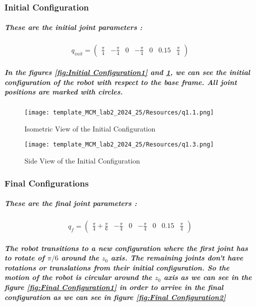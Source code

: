 \subsubsection{Initial Configuration}
\subparagraph{These are the initial joint parameters :}
\[
q_{init} = \begin{pmatrix}
    \frac{\pi}{4} & -\frac{\pi}{4} & 0 & -\frac{\pi}{4} & 0 & 0.15 & \frac{\pi}{4}
\end{pmatrix}
\]
\subparagraph{In the figures \ref{fig:Initial Configuration1} and \ref{fig:Initial Configuration2}, we can see the initial configuration of the robot with respect to the base frame. All joint positions are marked with circles.}

\begin{figure}[h!]
    \begin{minipage}{0.5\textwidth}
        \centering
        \texttt{[image: template\_MCM\_lab2\_2024\_25/Resources/q1.1.png]}
        \caption{Isometric View of the Initial Configuration}
        \label{fig:Initial Configuration1}
    \end{minipage}%
    \hfill
    \begin{minipage}{0.5\textwidth}
        \centering
        \texttt{[image: template\_MCM\_lab2\_2024\_25/Resources/q1.3.png]}
        \caption{Side View of the Initial Configuration}
        \label{fig:Initial Configuration2}
    \end{minipage}
\end{figure}

\subsubsection{Final Configurations}
\subparagraph{These are the final joint parameters :}
\[
q_f = \begin{pmatrix}
    \frac{\pi}{4} + \frac{\pi}{6} & -\frac{\pi}{4} & 0 & -\frac{\pi}{4} & 0 & 0.15 & \frac{\pi}{4}
\end{pmatrix}
\]
\subparagraph{The robot transitions to a new configuration where the first joint has to rotate of $\pi/6$ around the $z_0$ axis. The remaining joints don't have rotations or translations from their initial configuration. So the motion of the robot is circular around the $z_0$ axis as we can see in the figure \ref{fig:Final Configuration1} in order to arrive in the final configuration as we can see in figure \ref{fig:Final Configuration2}}

